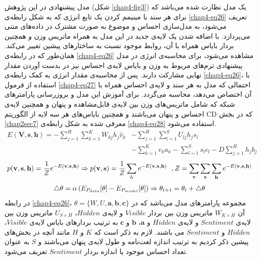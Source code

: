 مدل پیشنهادی در این پژوهش 
(شکل \ref{chap4-fig3})
 یک مدل نظارت شده می‌‌باشد که برای هر سند با مینیمم کردن یک تابع انرژی که به شکل رابطه‌‌ی
\ref{chap4-eq26}
تعریف می‌‌شود، به مدل‌سازی احساس و موضوع به صورت مشترک در داده‌های متنی می‌‌پردازد. با اضافه شدن یک لایه‌ی جدید در این مدل به همراه ماتریس وزن و همچنین بردار بایاس همراه با آن، روابط موجود نسبت به ساختار‌های پیشین تغییر می‌کند. همان‌طور که در رابطه‌ی
\ref{chap4-eq26}
مشاهده می‌‌شود، برای محاسبه‌ی انرژی در مدل پیشنهادی ترم‌های مربوط به وزن و بایاس لایه‌ی احساس نیز در بدست آوردن مقدار نهایی مشارکت دارند. پس از محاسبه‌ی مقدار انرژی به کمک رابطه‌ی
\ref{chap4-eq26}،
 با استفاده از فرمول
\ref{chap4-eq27}
احتمالی‌ که مدل به هر سند و ‌لایه‌ی احساس همراه با آن اختصاص می‌‌دهد، محاسبه می‌‌گردد. برای آموزش این مدل و بروزرسانی پارامترهای شبکه که شامل ماتریس‌های وزن بین لایه‌ی قابل‌مشاهده و پنهان و همچنین لایه‌ی احساس و پنهان می‌‌باشند و همچنین بایاس‌های هر سه‌ لایه از الگوریتم
CD
که در بخش
\ref{chap2sec7}
معرفی‌ شده به شکل رابطه‌ی
\ref{chap4-eq28}
استفاده می‌‌شود.
\begin{align}
	\label{chap4-eq26}
	E(\textbf{V},\textbf{s},\textbf{h})=-\sum_{j=1}^{H}\sum_{k=1}^{K}W_{kj}h_j\hat{v}_{k}&-\sum_{j=1}^{H}\sum_{l=1}^{S}U_{lj}h_js_l\\\nonumber
	&-\sum_{k=1}^{K}v_{k}a_{k} -\sum_{l=1}^{S}s_lc_l- D\sum_{j=1}^{H}h_jb_j
\end{align}
\begin{align}
	\centering
	\label{chap4-eq27}
	p(\textbf{v},\textbf{s},\textbf{h}) = \dfrac{1}{Z} e^{-E(\textbf{v},\textbf{s},\textbf{h})} \Rightarrow
	p(\textbf{v},\textbf{s}) = \dfrac{1}{Z} \sum_{h}  e^{-E(\textbf{v},\textbf{s},\textbf{h})} \ \ ,
	Z = \sum_{\textbf{v}}\sum_{\textbf{s}}\sum_{\textbf{h}} e^{-E(\textbf{v},\textbf{s},\textbf{h})} 
\end{align}
\begin{align}
	\centering
	\label{chap4-eq28}
	\triangle\theta = \alpha \left( E_{P_{data}}[\theta]-E_{P_{model}}[\theta]\right) \Rightarrow \theta_{t+1} = \theta_t + \triangle\theta
\end{align}
در رابطه
\ref{chap4-eq26}، $\theta=\{W, U, \textbf{a}, \textbf{b}, \textbf{c} \}$
مجموعه پارامتر‌های مدل می‌‌باشد که در آن
$W_{K \times H}$
ماتریس وزن بین بردار
$Visible$
و لایه‌ی
$Hidden$، $U_{S \times H}$
ماتریس وزن بین لایه‌ی
$Sentiment$
و لایه‌ی
$Hidden$
و
$\textbf{a}$، $\textbf{b}$
و
$\textbf{c}$
به ترتیب بردار‌های بایاس لایه‌ی
$Visible$، $Hidden$
و
$Sentiment$
می‌ باشند. لازم به ذکر است که
$K$
و
$H$
مانند آنچه در بخش‌های پیشین ذکر کردیم به ترتیب اندازه لغت‌نامه و طول لایه‌ی پنهان می‌‌باشند و
$S$
به عنوان تعداد احساس موجود یا اندازه بردار
$Sentiment$
تعریف می‌‌شود.

